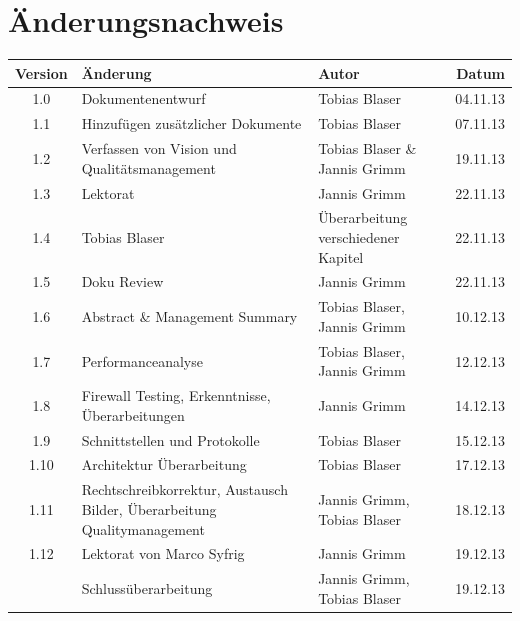 



\chapter*{Änderungsnachweis}
\begin{tabularx}{\textwidth}{|cXlr|} %
		\hline
		\textbf{Version} & \textbf{Änderung} & \textbf{Autor} & \textbf{Datum}\\
		\hline
		1.0 & Dokumentenentwurf & Tobias Blaser & 04.11.13\\
		1.1 & Hinzufügen zusätzlicher Dokumente & Tobias Blaser & 07.11.13\\
		1.2 & Verfassen von Vision und Qualitätsmanagement & Tobias Blaser \& Jannis Grimm & 19.11.13\\
		1.3 & Lektorat & Jannis Grimm & 22.11.13\\
		1.4 & Tobias Blaser & Überarbeitung verschiedener Kapitel & 22.11.13\\
		1.5 & Doku Review & Jannis Grimm & 22.11.13\\
		1.6 & Abstract \& Management Summary & Tobias Blaser, Jannis Grimm & 10.12.13\\
		1.7 & Performanceanalyse & Tobias Blaser, Jannis Grimm & 12.12.13\\
		1.8 & Firewall Testing, Erkenntnisse, Überarbeitungen & Jannis
		Grimm & 14.12.13\\
		1.9 & Schnittstellen und Protokolle & Tobias Blaser & 15.12.13\\
		1.10 & Architektur Überarbeitung & Tobias Blaser & 17.12.13\\
		1.11 & Rechtschreibkorrektur, Austausch Bilder, Überarbeitung
		Qualitymanagement & Jannis Grimm, Tobias Blaser & 18.12.13\\
		1.12 & Lektorat von Marco Syfrig & Jannis Grimm & 19.12.13\\
		\versionnumber & Schlussüberarbeitung & Jannis Grimm, Tobias Blaser & 19.12.13\\
		\hline
\end{tabularx}

\tableofcontents






